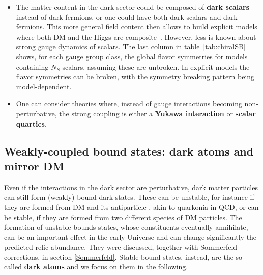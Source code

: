 \begin{itemize}
\item[\scalebox{0.6}{$\blacksquare$}]
The matter content in the dark sector could be composed of {\bf dark scalars} instead of dark fermions, or one could have both dark scalars and dark fermions.
This more general field content then allows to build explicit models where both DM and the Higgs are composite~\cite{CompositeHiggsDM}.
However, less is known about strong gauge dynamics of scalars. The last column in table~\ref{tab:chiralSB} shows, for each gauge group class, 
the global flavor symmetries for models containing $N_S$ scalars, assuming these are unbroken. 
In explicit models the flavor symmetries can be broken, with the symmetry breaking pattern being model-dependent.


\item[\scalebox{0.6}{$\blacksquare$}]
One can consider theories where, instead of gauge interactions becoming non-perturbative, the strong coupling is either a {\bf Yukawa interaction} or {\bf scalar quartics}.  
\end{itemize}

\subsection{Weakly-coupled bound states: dark atoms and mirror DM}

\label{sec:dark:atoms}
Even if the interactions in the dark sector are perturbative, dark matter particles can still form (weakly) bound dark states. These can be unstable, for instance if they are formed from DM and its antiparticle \cite{BoundStates}, akin to quarkonia in QCD, or can be stable, if they are formed from two different species of DM particles. The formation of unstable bounds states, whose constituents eventually annihilate, can be an important effect in the early Universe and can change significantly the predicted relic abundance. They were discussed, together with Sommerfeld corrections, in section \ref{Sommerfeld}. Stable bound states, instead, are the so called {\bf dark atoms} \cite{dark:atoms} and we focus on them in the following. 

\bigskip

